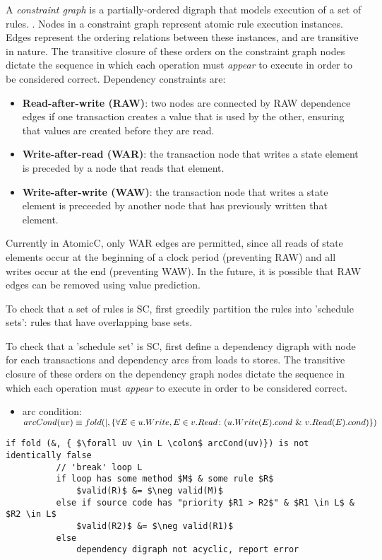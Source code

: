A \textit{constraint graph} is a partially-ordered digraph that models
execution of a set of rules.
\cite[Sec.~3]{Cain2003}.
Nodes in a constraint graph represent atomic rule execution instances.  Edges
represent the ordering relations between these instances, and are transitive in nature.
The transitive closure of these orders on the constraint graph nodes
dictate the sequence in which each operation must \textit{appear} to execute in
order to be considered correct.
Dependency constraints are:
\begin{itemize}
\item \textbf{Read-after-write (RAW)}: two nodes are connected by RAW dependence
edges if one transaction creates a value that is used by the other, ensuring
that values are created before they are read.
\item \textbf{Write-after-read (WAR)}: the transaction node that writes a state
element is preceded by a node that reads that element.
\item \textbf{Write-after-write (WAW)}: the transaction node that writes a state
element is preceeded by another node that has previously written that element.
\end{itemize}
Currently in AtomicC, only WAR edges are permitted, since all reads
of state elements occur at the beginning of a clock period (preventing RAW)
and all writes occur at the end (preventing WAW).
In the future, it is possible that RAW edges can be removed using value prediction.

To check that a set of rules is SC, 
first greedily partition the rules into 'schedule sets': rules that have
overlapping base sets.

To check that a 'schedule set' is SC, first
define a dependency digraph with node for each transactions and
dependency arcs from loads to stores.
The transitive closure of these orders on the dependency graph nodes dictate
the sequence in which each operation must \textit{appear} to execute in order to
be considered correct.
\cite[Sec.~11.1]{OV11}

\begin{itemize}
\item arc condition: $arcCond(uv) \equiv
\newline
      fold (|, \{ \forall E \in u.Write, E \in v.Read \colon (u.Write(E).cond\ \&\ v.Read(E).cond) \})$
\end{itemize}

\begin{lstlisting}[mathescape=true]
       if fold (&, { $\forall uv \in L \colon$ arcCond(uv)}) is not identically false
          // 'break' loop L
          if loop has some method $M$ & some rule $R$
              $valid(R)$ &= $\neg valid(M)$
          else if source code has "priority $R1 > R2$" & $R1 \in L$ & $R2 \in L$
              $valid(R2)$ &= $\neg valid(R1)$
          else
              dependency digraph not acyclic, report error
\end{lstlisting}

